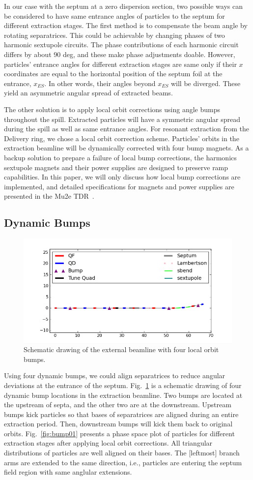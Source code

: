 \documentclass[aps,prstab,onecolumn,preprint,endfloats,11pt]{revtex4-1}
\begin{document}
In our case with the septum at a zero dispersion section, two possible ways can be considered to have same entrance angles of particles to the septum for different extraction stages.
The first method is to compensate the beam angle by rotating separatrices. This could be achievable by changing phases of two harmonic sextupole circuits.
The phase contributions of each harmonic circuit differs by about 90 deg, and these make phase adjustments doable.
However, particles' entrance angles for different extraction stages are same only if their $x$ coordinates are equal to the horizontal position of the septum foil at the entrance, $x_{ES}$.
In other words, their angles beyond $x_{ES}$ will be diverged.
These yield an asymmetric angular spread of extracted beams.

The other solution is to apply local orbit corrections using angle bumps throughout the spill.
Extracted particles will have a symmetric angular spread during the spill as well as same entrance angles.
For resonant extraction from the Delivery ring, we chose a local orbit correction scheme.
Particles' orbits in the extraction beamline will be dynamically corrected with four bump magnets.
As a backup solution to prepare a failure of local bump corrections, the harmonics sextupole magnets and their power supplies are designed to preserve ramp capabilities.
In this paper, we will only discuss how local bump corrections are implemented, and detailed specifications for magnets and power supplies are presented in the Mu2e TDR~\cite{tdr}.

\subsection{\label{sec:bump1}Dynamic Bumps}

\begin{figure}[!tbp]
  \includegraphics[width=.45\textwidth]{img/fig_bump2}
  \caption{\label{fig:bump1}Schematic drawing of the external beamline with four local orbit bumps.}
\end{figure}

Using four dynamic bumps, we could align separatrices to reduce angular deviations at the entrance of the septum.
Fig.~\ref{fig:bump1} is a schematic drawing of four dynamic bump locations in the extraction beamline.
Two bumps are located at the upstream of septa, and the other two are at the downstream.
Upstream bumps kick particles so that bases of separatrices are aligned during an entire extraction period.
Then, downstream bumps will kick them back to original orbits.
Fig.~\ref{fig:bump01} presents a phase space plot of particles for different extraction stages after applying local orbit corrections.
All triangular distributions of particles are well aligned on their bases.
The [leftmost] branch arms are extended to the same direction, i.e., particles are entering the septum field region with same anglular extensions.
\end{document}
